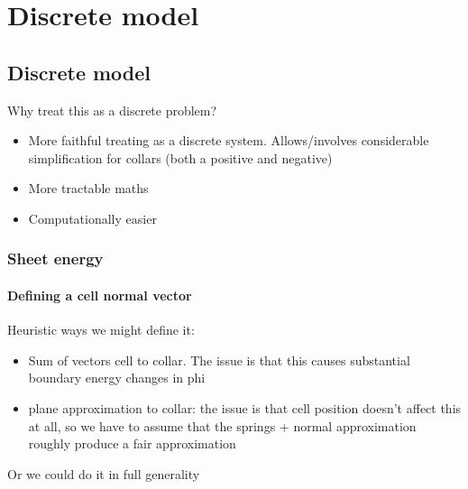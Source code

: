 \chapter{Discrete model}

\ifpdf
    \graphicspath{{Chapter3/Figs/Raster/}{Chapter3/Figs/PDF/}{Chapter3/Figs/}}
\else
    \graphicspath{{Chapter3/Figs/Vector/}{Chapter3/Figs/}}
\fi

\section{Discrete model}
Why treat this as a discrete problem? 
\begin{itemize}
    \item More faithful treating as a discrete system. Allows/involves considerable simplification for collars (both a positive and negative)
    \item More tractable maths
    \item Computationally easier
\end{itemize}

\subsection{Sheet energy}

\subsubsection{Defining a cell normal vector}

Heuristic ways we might define it: 
\begin{itemize}
    \item Sum of vectors cell to collar. The issue is that this causes substantial boundary energy changes in phi
    \item plane approximation to collar: the issue is that cell position doesn't affect this at all, so we have to assume that the springs + normal approximation roughly produce a fair approximation
\end{itemize}

Or we could do it in full generality


